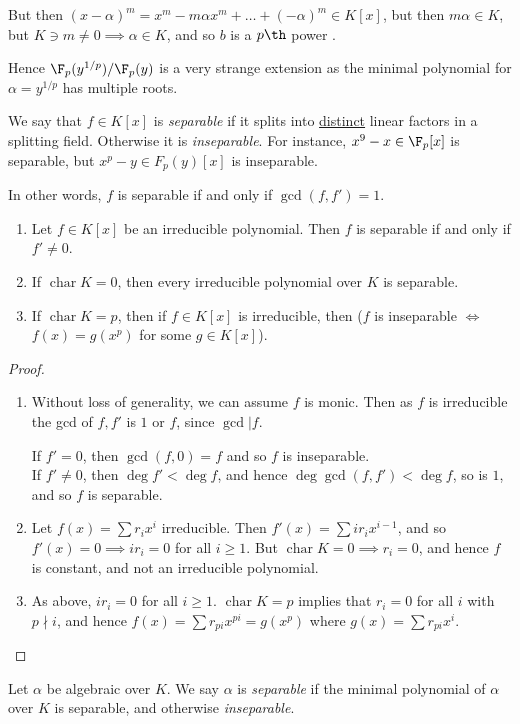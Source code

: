 \documentclass[a4paper, 10pt, twocolumn]{amsart}
\renewcommand{\charr}{\operatorname{char}}
\begin{document}
But then $(x-\alpha)^m = x^m - m\alpha x^m + \ldots + (-\alpha)^m \in K[x]$, but then $m\alpha \in K$, but $K \ni m \neq 0 \implies \alpha \in K$, and so $b$ is a $p\th$ power \contr.

Hence $\F_p(y^{1/p}) / \F_p(y)$ is a very strange extension as the minimal polynomial for $\alpha = y^{1/p}$ has multiple roots.

We say that $f \in K[x]$ is \emph{separable} if it splits into \underline{distinct} linear factors in a splitting field. Otherwise it is \emph{inseparable}. For instance, $x^9-x \in \F_p[x]$ is separable, but $x^p-y \in F_p(y)[x]$ is inseparable.

In other words, $f$ is separable if and only if $\gcd(f,f') = 1$.
\begin{proposition}
\item
\begin{enumerate}
\item Let $f\in K[x]$ be an irreducible polynomial. Then $f$ is separable if and only if $f' \neq 0$.
\item If $\charr K = 0$, then every irreducible polynomial over $K$ is separable.
\item If $\charr K = p$, then if $f \in K[x]$ is irreducible, then ($f$ is inseparable $\iff$ $f(x) = g(x^p)$ for some $g \in K[x]$).
\end{enumerate}
\end{proposition}
\begin{proof}
\item
\begin{enumerate}
\item Without loss of generality, we can assume $f$ is monic. Then as $f$ is irreducible the gcd of $f, f'$ is $1$ or $f$, since $\gcd | f$.

If $f'=0$, then $\gcd(f,0) = f$ and so $f$ is inseparable.\\
If $f'\neq 0$, then $\deg f' < \deg f$, and hence $\deg\gcd(f,f')<\deg f$, so is $1$, and so $f$ is separable.
\item Let $f(x) = \sum r_i x^i$ irreducible. Then $f'(x) = \sum i r_i x^{i-1}$, and so $f'(x) = 0 \implies ir_i = 0$ for all $i\geq 1$. But $\charr K = 0 \implies r_i = 0$, and hence $f$ is constant, and not an irreducible polynomial.

\item As above, $ir_i = 0$ for all $i\geq 1$. $\charr K = p$ implies that $r_i = 0$ for all $i$ with $p\nmid i$, and hence $f(x) = \sum r_{pi}x^{pi} = g(x^p)$ where $g(x) = \sum r_{pi}x^i$.
\end{enumerate}
\end{proof}
Let $\alpha$ be algebraic over $K$. We say $\alpha$ is \emph{separable} if the minimal polynomial of $\alpha$ over $K$ is separable, and otherwise \emph{inseparable}.
\end{document}
